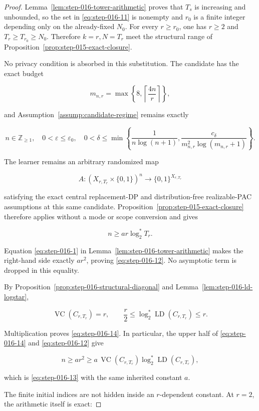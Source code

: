 \begin{proof}
Lemma~\ref{lem:step-016-tower-arithmetic} proves that \(T_s\) is
increasing and unbounded, so the set in \eqref{eq:step-016-11} is nonempty and \(r_0\) is a
finite integer depending only on the already-fixed \(N_0\). For every
\(r\ge r_0\), one has \(r\ge2\) and \(T_r\ge T_{r_0}\ge N_0\).
Therefore \(k=r,N=T_r\) meet the structural range of Proposition~\ref{prop:step-015-exact-closure}.

No privacy condition is absorbed in this substitution. The candidate has
the exact budget

\[
m_{n,r}=\max\left\{8,\left\lceil\frac{4n}{r}\right\rceil\right\},
\]

and Assumption~\ref{assump:candidate-regime} remains exactly

\[
n\in\mathbb Z_{\ge1},
\quad 0<\varepsilon\le\varepsilon_0,
\quad
0<\delta\le
\min\left\{
\frac1{n\log(n+1)},
\frac{c_\delta}{m_{n,r}^2\log(m_{n,r}+1)}
\right\}.
\tag{S16.15}\label{eq:step-016-15}
\]

The learner remains an arbitrary randomized map

\[
A:(X_{r,T_r}\times\{0,1\})^n
  \longrightarrow\{0,1\}^{X_{r,T_r}}
\]

satisfying the exact central replacement-DP and distribution-free
realizable-PAC assumptions at this same candidate. Proposition~\ref{prop:step-015-exact-closure} therefore applies without a
mode or scope conversion and gives

\[
n\ge ar\log_2^*T_r.
\]

Equation \eqref{eq:step-016-1} in Lemma~\ref{lem:step-016-tower-arithmetic} makes the
right-hand side exactly \(ar^2\), proving \eqref{eq:step-016-12}. No asymptotic term is
dropped in this equality.

By Proposition~\ref{prop:step-016-structural-diagonal} and
Lemma~\ref{lem:step-016-ld-logstar},

\[
\operatorname{VC}(C_{r,T_r})=r,
\qquad
\frac r2
\le\log_2^*\operatorname{LD}(C_{r,T_r})\le r.
\]

Multiplication proves \eqref{eq:step-016-14}. In particular, the upper half of \eqref{eq:step-016-14} and
\eqref{eq:step-016-12} give

\[
n\ge ar^2
\ge
a\,\operatorname{VC}(C_{r,T_r})
   \log_2^*\operatorname{LD}(C_{r,T_r}),
\]

which is \eqref{eq:step-016-13} with the same inherited constant \(a\).

The finite initial indices are not hidden inside an \(r\)-dependent
constant. At \(r=2\), the arithmetic itself is exact:


\end{proof}
